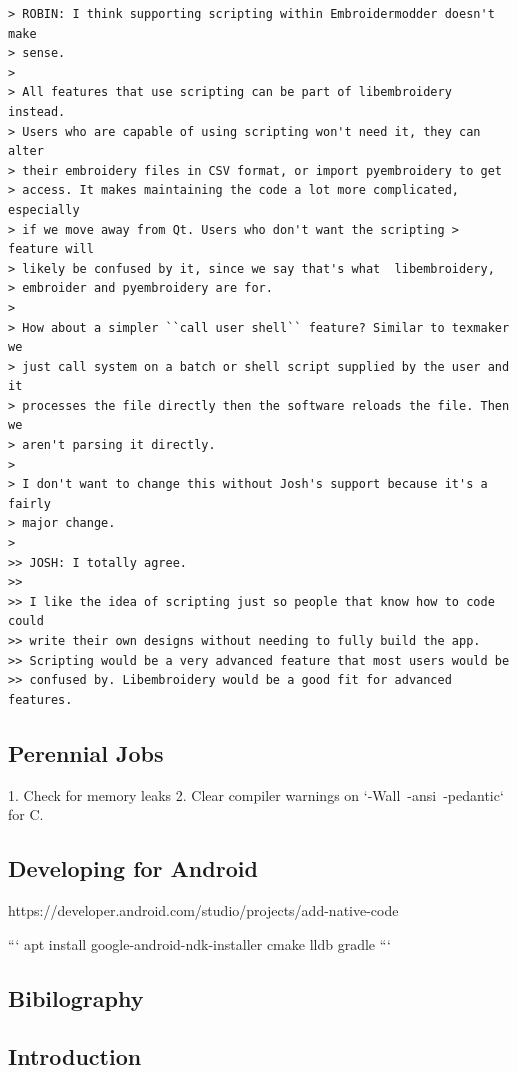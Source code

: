 \documentclass[11pt]{report}
\begin{document}
\begin{verbatim}
> ROBIN: I think supporting scripting within Embroidermodder doesn't make
> sense.
>
> All features that use scripting can be part of libembroidery instead.
> Users who are capable of using scripting won't need it, they can alter
> their embroidery files in CSV format, or import pyembroidery to get
> access. It makes maintaining the code a lot more complicated, especially
> if we move away from Qt. Users who don't want the scripting > feature will
> likely be confused by it, since we say that's what  libembroidery,
> embroider and pyembroidery are for.
>
> How about a simpler ``call user shell`` feature? Similar to texmaker we
> just call system on a batch or shell script supplied by the user and it
> processes the file directly then the software reloads the file. Then we
> aren't parsing it directly.
>
> I don't want to change this without Josh's support because it's a fairly
> major change.
>
>> JOSH: I totally agree.
>>
>> I like the idea of scripting just so people that know how to code could
>> write their own designs without needing to fully build the app.
>> Scripting would be a very advanced feature that most users would be
>> confused by. Libembroidery would be a good fit for advanced features.
\end{verbatim}

\subsection{Perennial Jobs}

1. Check for memory leaks
2. Clear compiler warnings on `-Wall\ -ansi\ -pedantic` for C.

\subsection{Developing for Android}

https://developer.android.com/studio/projects/add-native-code

```
apt install google-android-ndk-installer cmake lldb gradle
```

\subsection{Bibilography}

\subsection{Introduction}
\end{document}
